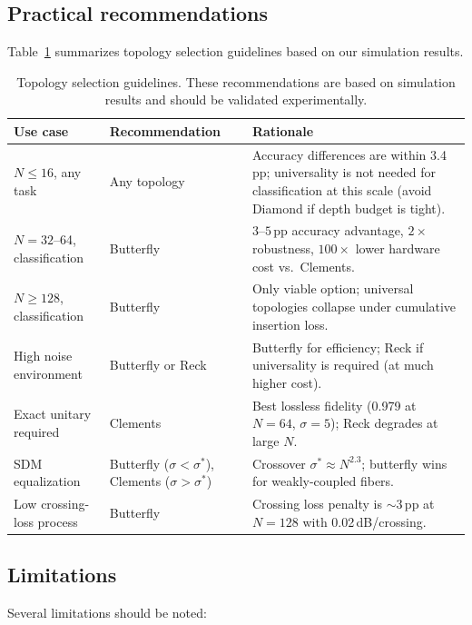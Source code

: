 \documentclass[11pt,a4paper]{article}
\begin{document}
\subsection{Practical recommendations}

Table~\ref{tab:recommend} summarizes topology selection guidelines based on our
simulation results.

\begin{table}[H]
\centering
\caption{Topology selection guidelines.  These recommendations are based on
simulation results and should be validated experimentally.}
\label{tab:recommend}
\begin{tabular}{p{3.0cm}p{2.8cm}p{7.5cm}}
\toprule
Use case & Recommendation & Rationale \\
\midrule
$N \leq 16$, any task & Any topology & Accuracy differences are within 3.4\,pp; universality
  is not needed for classification at this scale (avoid Diamond if depth budget is tight). \\
$N{=}32$--64, classification & Butterfly & $3$--$5$\,pp accuracy advantage, $2\times$
  robustness, $100\times$ lower hardware cost vs.\ Clements. \\
$N \geq 128$, classification & Butterfly & Only viable option; universal topologies
  collapse under cumulative insertion loss. \\
High noise environment & Butterfly or Reck & Butterfly for efficiency; Reck if
  universality is required (at much higher cost). \\
Exact unitary required & Clements & Best lossless fidelity (0.979 at $N{=}64$,
  $\sigma{=}5$); Reck degrades at large $N$. \\
SDM equalization & Butterfly ($\sigma < \sigma^*$), Clements ($\sigma > \sigma^*$) &
  Crossover $\sigma^* \approx N^{2.3}$; butterfly wins for weakly-coupled fibers. \\
Low crossing-loss process & Butterfly & Crossing loss penalty is ${\sim}3$\,pp at $N{=}128$
  with 0.02\,dB/crossing. \\
\bottomrule
\end{tabular}
\end{table}

\subsection{Limitations}

Several limitations should be noted:
\end{document}
